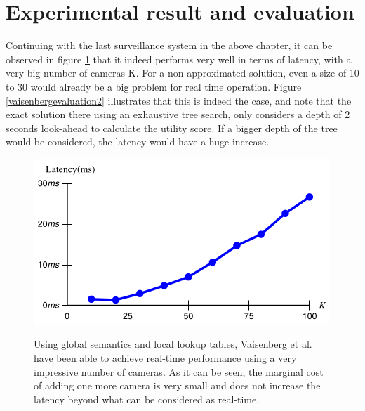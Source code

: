 \documentclass[a4paper,11pt,english]{article}
\begin{document}
\section{Experimental result and evaluation}
Continuing with the last surveillance system in the above chapter, it can be observed in figure \ref{vaisenbergevaluation1} that it indeed performs very well in terms of latency, with a very big number of cameras K. For a non-approximated solution, even a size of 10 to 30 would already be a big problem for real time operation. Figure \ref{vaisenbergevaluation2} illustrates that this is indeed the case, and note that the exact solution there using an exhaustive tree search, only considers a depth of 2 seconds look-ahead to calculate the utility score. If a bigger depth of the tree would be considered, the latency would have a huge increase.
\begin{figure}[H]
  \caption{Using global semantics and local lookup tables, Vaisenberg et al. \cite{vaisenberg2014scheduling} have been able to achieve real-time performance using a very impressive number of cameras. As it can be seen, the marginal cost of adding one more camera is very small and does not increase the latency beyond what can be considered as real-time.}
  \centering
    \includegraphics[scale=0.5]{vaisenbergevaluation1.png}
  \label{vaisenbergevaluation1}
\end{figure}
\end{document}
